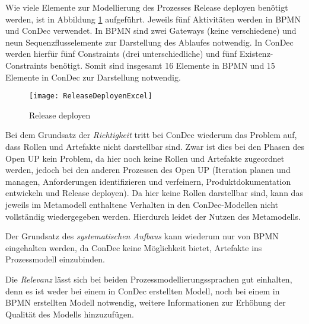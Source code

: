 Wie viele Elemente zur Modellierung des Prozesses Release deployen benötigt werden, ist in Abbildung \ref{fig:ReleaseDeployenExcel} aufgeführt. Jeweils fünf Aktivitäten werden in BPMN und ConDec verwendet. In BPMN sind zwei Gateways (keine verschiedene) und neun Sequenzflusselemente zur Darstellung des Ablaufes notwendig. In ConDec werden hierfür fünf Constraints (drei unterschiedliche)  und fünf Existenz-Constraints benötigt. Somit sind insgesamt 16 Elemente in BPMN und 15 Elemente in ConDec zur Darstellung notwendig. \newline
\begin{figure}[htp]
\begin{center}
  \texttt{[image: ReleaseDeployenExcel]} %
  \caption{Release deployen}
  \label{fig:ReleaseDeployenExcel}
\end{center}
\end{figure}

Bei dem Grundsatz der \textit{Richtigkeit} tritt bei ConDec wiederum das Problem auf, dass Rollen und Artefakte nicht darstellbar sind. Zwar ist dies bei den Phasen des Open UP kein Problem, da hier noch keine Rollen und Artefakte zugeordnet werden, jedoch bei den anderen Prozessen des Open UP (Iteration planen und managen, Anforderungen identifizieren und verfeinern, Produktdokumentation entwickeln und Release deployen). Da hier keine Rollen darstellbar sind, kann das jeweils im Metamodell enthaltene Verhalten in den ConDec-Modellen nicht vollständig wiedergegeben werden. Hierdurch leidet der Nutzen des Metamodells. \newline

Der Grundsatz des \textit{systematischen Aufbaus} kann wiederum nur von BPMN eingehalten werden, da ConDec keine Möglichkeit bietet, Artefakte ins Prozessmodell einzubinden.\newline

Die \textit{Relevanz} lässt sich bei beiden Prozessmodellierungssprachen gut einhalten, denn es ist weder bei einem in ConDec erstellten Modell, noch bei einem in BPMN erstellten Modell notwendig, weitere Informationen zur Erhöhung der Qualität des Modells hinzuzufügen.\newline

